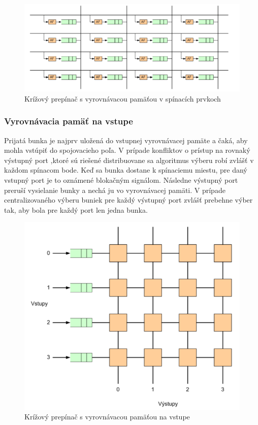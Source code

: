 \begin{figure}[ht]
\centering
  \begin{center}
    \includegraphics[scale=0.8]{BPC-HWS/images/kriz_prep_spin.png}
  \end{center}
  \caption[Krížový prepínač s vyrovnávacou pamäťou v spínacích prvkoch]{Krížový prepínač s vyrovnávacou pamäťou v spínacích prvkoch}
\end{figure}

\subsubsection{Vyrovnávacia pamäť na vstupe}
Prijatá bunka je najprv uložená do vstupnej vyrovnávacej pamäte a čaká, aby mohla vstúpiť do spojovacieho poľa. V prípade konfliktov o prístup na rovnaký výstupný port ,ktoré sú riešené distribuovane sa algoritmus výberu robí zvlášť v každom spínacom bode. Keď sa bunka dostane k spínaciemu miestu, pre daný vstupný port je to oznámené blokačným signálom. Následne výstupný port preruší vysielanie bunky a nechá ju vo vyrovnávacej pamäti. V prípade centralizovaného výberu buniek pre každý výstupný port zvlášť prebehne výber tak, aby bola pre každý port len jedna bunka.

\begin{figure}[ht]
\centering
  \begin{center}
    \includegraphics[scale=0.5]{BPC-HWS/images/kriz_prep_vstup.png}
  \end{center}
  \caption[Krížový prepínač s vyrovnávacou pamäťou na vstupe]{Krížový prepínač s vyrovnávacou pamäťou na vstupe}
\end{figure}

